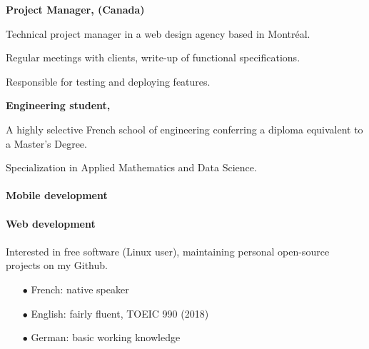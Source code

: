 \documentclass{cv}
\begin{document}
\begin{expbox}[title={may 2018, \faicon{clock-o} 4 months}]

	\begin{minipage}[c]{20mm}
	\end{minipage}
	\begin{minipage}[c]{0.8\textwidth}

	\textbf{Project Manager, \adfab{} (Canada)} 

	Technical project manager in a web design agency based in Montréal.

	Regular meetings with clients, write-up of functional specifications.

	Responsible for testing and deploying features.
	\end{minipage}

\end{expbox}

\begin{expbox}[title={2016 -- 2019}]

	\begin{minipage}[c]{20mm}
	\end{minipage}
	\begin{minipage}[c]{0.8\textwidth}

	\textbf{Engineering student, \ecn{}} 

	A highly selective French school of engineering conferring a diploma equivalent to a Master’s Degree. 

	Specialization in Applied Mathematics and Data Science.
	\end{minipage}

\end{expbox}



\paragraph{Mobile development} 
   

\paragraph{Web development}
      

\paragraph{} Interested in free software (Linux user), maintaining personal open-source projects on my Github.


\begin{itemize}
\setlength\itemsep{0pt}
\item[$\bullet$] French: native speaker
\item[$\bullet$] English: fairly fluent, TOEIC 990 (2018)
\item[$\bullet$] German: basic working knowledge
\end{itemize}
\end{document}
